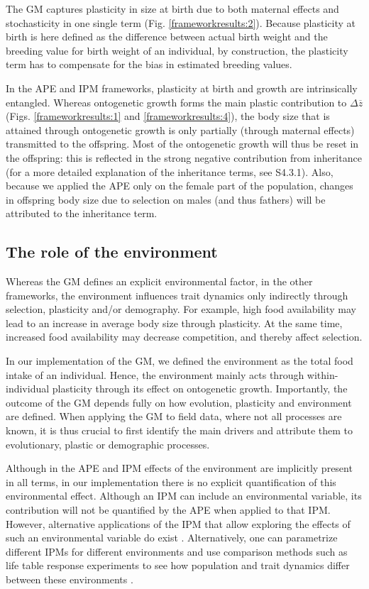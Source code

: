 The GM captures plasticity in size at birth due to both maternal effects and stochasticity in one single term (Fig. \ref{frameworkresults:2}). Because plasticity at birth is here defined as the difference between actual birth weight and the breeding value for birth weight of an individual, by construction, the plasticity term has to compensate for the bias in estimated breeding values.

In the APE and IPM frameworks, plasticity at birth and growth are intrinsically entangled. Whereas ontogenetic growth forms the main plastic contribution to $\Delta \overline z$ (Figs. \ref{frameworkresults:1} and \ref{frameworkresults:4}), the body size that is attained through ontogenetic growth is only partially (through maternal effects) transmitted to the offspring. Most of the ontogenetic growth will thus be reset in the offspring: this is reflected in the strong negative contribution from inheritance (for a more detailed explanation of the inheritance terms, see S4.3.1). Also, because we applied the APE only on the female part of the population, changes in offspring body size due to selection on males (and thus fathers) will be attributed to the inheritance term.

\subsection*{The role of the environment}
Whereas the GM defines an explicit environmental factor, in the other frameworks, the environment influences trait dynamics only indirectly through selection, plasticity and/or demography. For example, high food availability may lead to an increase in average body size through plasticity. At the same time, increased food availability may decrease competition, and thereby affect selection.

In our implementation of the GM, we defined the environment as the total food intake of an individual. Hence, the environment mainly acts through within-individual plasticity through its effect on ontogenetic growth. Importantly, the outcome of the GM depends fully on how evolution, plasticity and environment are defined. When applying the GM to field data, where not all processes are known, it is thus crucial to first identify the main drivers and attribute them to evolutionary, plastic or demographic processes.

Although in the APE and IPM effects of the environment are implicitly present in all terms, in our implementation there is no explicit
quantification of this environmental effect. Although an IPM can include an environmental variable, its contribution will not be quantified by the APE when applied to that IPM. However, alternative applications of the IPM that allow exploring the effects of such an environmental variable do exist \parencite[e.g.][]{vindenes2011}. Alternatively, one can parametrize different IPMs for different environments \parencite[e.g.][]{Ozgul2010} and use comparison methods such as life table response experiments to see how population and trait dynamics differ between these environments \parencite{rees2009}.

